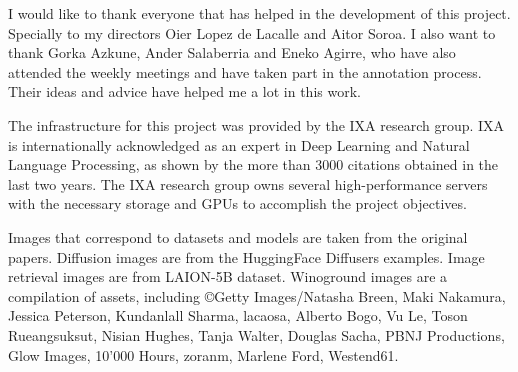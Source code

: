 I would like to thank everyone that has helped in the development of this project. Specially to my directors Oier Lopez de Lacalle and Aitor Soroa. I also want to thank Gorka Azkune, Ander Salaberria and Eneko Agirre, who have also attended the weekly meetings and have taken part in the annotation process. Their ideas and advice have helped me a lot in this work.

The infrastructure for this project was provided by the IXA research group. IXA is internationally acknowledged as an expert in Deep Learning and Natural Language Processing, as shown by the more than 3000 citations obtained in the last two years. The IXA research group owns several high-performance servers with the necessary storage and GPUs to accomplish the project objectives.

Images that correspond to datasets and models are taken from the original papers. Diffusion images are from the HuggingFace Diffusers examples. Image retrieval images are from LAION-5B dataset. Winoground images are a compilation of assets, including \copyright Getty Images/Natasha Breen, Maki Nakamura, Jessica Peterson, Kundanlall Sharma, lacaosa, Alberto Bogo, Vu Le, Toson Rueangsuksut, Nisian Hughes, Tanja Walter, Douglas Sacha, PBNJ Productions, Glow Images, 10'000 Hours, zoranm, Marlene Ford, Westend61.